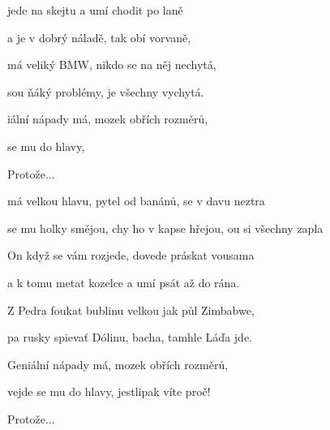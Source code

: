 

\zs
{} jede na skejtu
a umí chodit po laně

a  je v dobrý náladě,
tak obí vorvaně,

má veliký BMW,
nikdo se na něj nechytá,

 sou ňáký problémy,
 je všechny vychytá.

iální nápady má, mozek obřích rozměrů,

 se mu do hlavy, 

Protože...
\ks

\zr
{} má velkou hlavu,  pytel od banánů,
 se v davu neztra

 se mu holky smějou,
chy ho v kapse hřejou,
ou si všechny zapla
\kr

\zs
On když se vám rozjede,
dovede práskat vousama

a k tomu metat kozelce
a umí psát až do rána.

Z Pedra foukat bublinu
velkou jak půl Zimbabwe,

pa rusky spievať Dólinu,
bacha, tamhle Láďa jde.

Geniální nápady má, mozek obřích rozměrů,

vejde se mu do hlavy, jestlipak víte proč!

Protože...
\ks

\zr\kr
\zr\kr
\zr\kr

\kp





